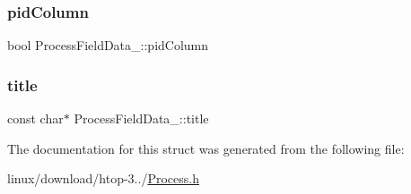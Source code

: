 \mbox{\label{structProcessFieldData___a417d65473a337bf426a468a139bfda79}} 
\subsubsection{\texorpdfstring{pid\+Column}{pidColumn}}
{\footnotesize\ttfamily bool Process\+Field\+Data\+\_\+\+::pid\+Column}

\mbox{\label{structProcessFieldData___a022c5103f9aa9b35814bd0baed04d09f}} 
\subsubsection{\texorpdfstring{title}{title}}
{\footnotesize\ttfamily const char$\ast$ Process\+Field\+Data\+\_\+\+::title}



The documentation for this struct was generated from the following file\+:\begin{DoxyCompactItemize}
\item 
linux/download/htop-\/3../\hyperlink{Process_8h}{Process.\+h}\end{DoxyCompactItemize}
